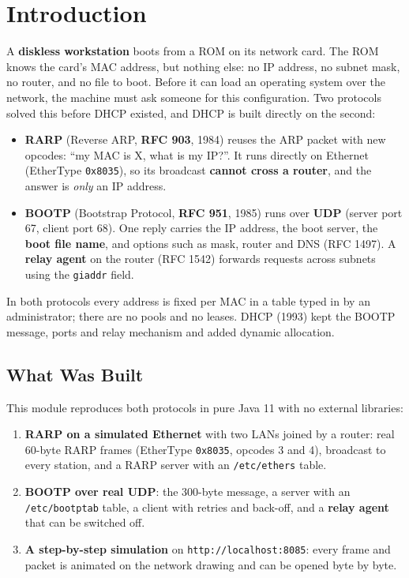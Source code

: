 \documentclass[11pt,a4paper]{article}
\begin{document}
\section{Introduction}
\noindent A \textbf{diskless workstation} boots from a ROM on its network card. The ROM knows the card's MAC address, but nothing else: no IP address, no subnet mask, no router, and no file to boot. Before it can load an operating system over the network, the machine must ask someone for this configuration. Two protocols solved this before DHCP existed, and DHCP is built directly on the second:
\begin{itemize}[leftmargin=2em]
    \item \textbf{RARP} (Reverse ARP, \textbf{RFC 903}, 1984) reuses the ARP packet with new opcodes: ``my MAC is X, what is my IP?''. It runs directly on Ethernet (EtherType \texttt{0x8035}), so its broadcast \textbf{cannot cross a router}, and the answer is \emph{only} an IP address.
    \item \textbf{BOOTP} (Bootstrap Protocol, \textbf{RFC 951}, 1985) runs over \textbf{UDP} (server port 67, client port 68). One reply carries the IP address, the boot server, the \textbf{boot file name}, and options such as mask, router and DNS (RFC 1497). A \textbf{relay agent} on the router (RFC 1542) forwards requests across subnets using the \texttt{giaddr} field.
\end{itemize}
In both protocols every address is fixed per MAC in a table typed in by an administrator; there are no pools and no leases. DHCP (1993) kept the BOOTP message, ports and relay mechanism and added dynamic allocation.

\subsection{What Was Built}
This module reproduces both protocols in pure Java 11 with no external libraries:
\begin{enumerate}[leftmargin=2em]
    \item \textbf{RARP on a simulated Ethernet} with two LANs joined by a router: real 60-byte RARP frames (EtherType \texttt{0x8035}, opcodes 3 and 4), broadcast to every station, and a RARP server with an \texttt{/etc/ethers} table.
    \item \textbf{BOOTP over real UDP}: the 300-byte message, a server with an \texttt{/etc/bootptab} table, a client with retries and back-off, and a \textbf{relay agent} that can be switched off.
    \item \textbf{A step-by-step simulation} on \texttt{http://localhost:8085}: every frame and packet is animated on the network drawing and can be opened byte by byte.
\end{enumerate}
\end{document}
